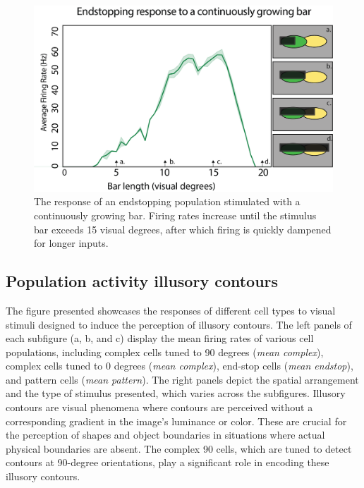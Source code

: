 \documentclass[12pt]{article}
\begin{document}
  \begin{figure}[H]
    \centering
    \includegraphics[width=1.0 \textwidth]{adjusted_figures/endstop_line_length.png}
    \caption{The response of an endstopping population stimulated with a continuously growing bar. Firing rates increase until the stimulus bar exceeds 15 visual degrees, after which firing is quickly dampened for longer inputs.}
    \label{fig:endstopping_length}
  \end{figure}

\subsection{Population activity illusory contours}
The figure presented showcases the responses of different cell types to visual stimuli designed to induce the perception of illusory contours. The left panels of each subfigure (a, b, and c) display the mean firing rates of various cell populations, including complex cells tuned to 90 degrees (\textit{mean complex}), complex cells tuned to 0 degrees (\textit{mean complex}), end-stop cells (\textit{mean endstop}), and pattern cells (\textit{mean pattern}). The right panels depict the spatial arrangement and the type of stimulus presented, which varies across the subfigures. Illusory contours are visual phenomena where contours are perceived without a corresponding gradient in the image's luminance or color. These are crucial for the perception of shapes and object boundaries in situations where actual physical boundaries are absent. The complex 90 cells, which are tuned to detect contours at 90-degree orientations, play a significant role in encoding these illusory contours.
\end{document}
